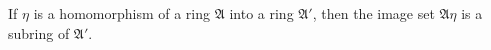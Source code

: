 If $\eta$ is a homomorphism of a ring $\mathfrak{A}$ into a ring $\mathfrak{A}'$, then the image set $\mathfrak{A}\eta$ is a subring of $\mathfrak{A}'$.
